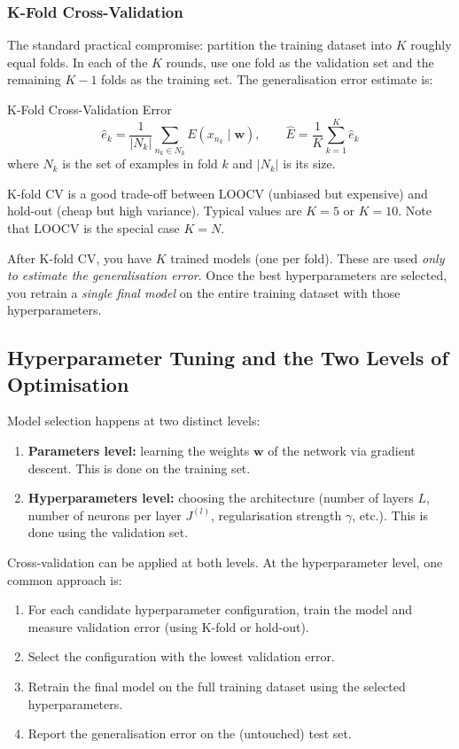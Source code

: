 \documentclass[11pt,a4paper]{article}
\begin{document}
\subsubsection{K-Fold Cross-Validation}

The standard practical compromise: partition the training dataset into $K$ roughly equal folds. In each of the $K$ rounds, use one fold as the validation set and the remaining $K-1$ folds as the training set. The generalisation error estimate is:

\begin{defbox}{K-Fold Cross-Validation Error}
\[
\hat{e}_k = \frac{1}{|N_k|}\sum_{n_k \in N_k} E(x_{n_k} \mid \mathbf{w}),
\qquad
\hat{E} = \frac{1}{K}\sum_{k=1}^K \hat{e}_k
\]
where $N_k$ is the set of examples in fold $k$ and $|N_k|$ is its size.
\end{defbox}

K-fold CV is a good trade-off between LOOCV (unbiased but expensive) and hold-out (cheap but high variance). Typical values are $K = 5$ or $K = 10$. Note that LOOCV is the special case $K = N$.

\begin{insightbox}
After K-fold CV, you have $K$ trained models (one per fold). These are used \emph{only to estimate the generalisation error}. Once the best hyperparameters are selected, you retrain a \emph{single final model} on the entire training dataset with those hyperparameters.
\end{insightbox}

\subsection{Hyperparameter Tuning and the Two Levels of Optimisation}

Model selection happens at two distinct levels:

\begin{enumerate}
  \item \textbf{Parameters level:} learning the weights $\mathbf{w}$ of the network via gradient descent. This is done on the training set.
  \item \textbf{Hyperparameters level:} choosing the architecture (number of layers $L$, number of neurons per layer $J^{(l)}$, regularisation strength $\gamma$, etc.). This is done using the validation set.
\end{enumerate}

Cross-validation can be applied at both levels. At the hyperparameter level, one common approach is:
\begin{enumerate}
  \item For each candidate hyperparameter configuration, train the model and measure validation error (using K-fold or hold-out).
  \item Select the configuration with the lowest validation error.
  \item Retrain the final model on the full training dataset using the selected hyperparameters.
  \item Report the generalisation error on the (untouched) test set.
\end{enumerate}
\end{document}
